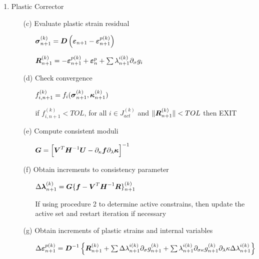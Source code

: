 \documentclass[epsf,a4paper]{article}
\newcommand{\mbf}[1]{\mbox{\boldmath$#1$}}
\newcommand{\ep}[0]{\mbf{\varepsilon}^p}
\newcommand{\e}{\mbf{\varepsilon}}
\newcommand{\sig}{\mbf{\sigma}}
\newcommand{\kap}{\mbf{\kappa}}
\begin{document}
\begin{table}
{\begin{enumerate}
\item
  Plastic Corrector
  \begin{enumerate}
  \item[(c)]
    Evaluate plastic strain residual
    \begin{itemize}
    \item[]
      $\sig^{(k)}_{n+1} = \mbf{D}\left(\e_{n+1}-\e^{p(k)}_{n+1}\right)$
    \item[]
      $\mbf{R}^{(k)}_{n+1}=-\e^{p(k)}_{n+1}+\ep_n+\sum\lambda^{i(k)}_{n+1}\partial_{\sigma}g_i$
    \end{itemize}
  \item[(d)]
    Check convergence
    \begin{itemize}
    \item[]
      $f^{(k)}_{i,n+1}=f_i(\sig^{(k)}_{n+1},\kap^{(k)}_{n+1})$
    \item[]
      if $f^{(k)}_{i,n+1} < TOL$, for all $i\in J^{(k)}_{act}$ and $\Vert\mbf{R}^{(k)}_{n+1}\Vert<TOL$ then EXIT
    \end{itemize}
  \item[(e)]
    Compute consistent moduli
    \begin{itemize}
    \item[]
      $\mbf{G}=\left[\mbf{V}^T\mbf{H}^{-1}\mbf{U}-\partial_{\kappa}\mbf{f}\partial_{\lambda}\mbf{\kappa}\right]^{-1}$
    \end{itemize}
  \item[(f)]
    Obtain increments to consistency parameter
    \begin{itemize}
    \item[]
      $\Delta\mbf{\lambda}^{(k)}_{n+1}=\mbf{G}\{\mbf{f}-\mbf{V}^T\mbf{H}^{-1}\mbf{R}\}^{(k)}_{n+1}$
    \item[]
      If using procedure 2 to determine active constrains, then update the active set and restart iteration if necessary
    \end{itemize}
  \item[(g)]
    Obtain increments of plastic strains and internal variables
    \begin{itemize}
    \item[]
      $\Delta\e^{p(k)}_{n+1}=\mbf{D}^{-1}\left\{\mbf{R}^{(k)}_{n+1}+\sum\Delta\lambda^{i(k)}_{n+1}\partial_{\sigma}g^{(k)}_{n+1}+\sum\lambda^{i(k)}_{n+1}\partial_{\sigma\kappa}g^{(k)}_{n+1}\partial_{\lambda}\kappa\Delta\lambda^{i(k)}_{n+1}\right\}$

\end{itemize}
\end{enumerate}
\end{enumerate}}
\end{table}
\end{document}
